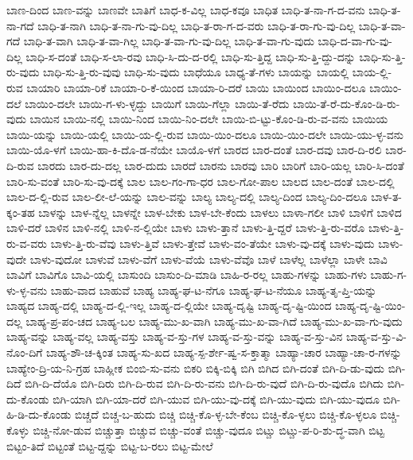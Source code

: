 {ಬಾಣ-ದಿಂದ
ಬಾಣ-ವನ್ನು
ಬಾಣವೇ
ಬಾತಿಗೆ
ಬಾಧ-ಕ-ವಿಲ್ಲ
ಬಾಧ-ಕವೂ
ಬಾಧಿತ
ಬಾಧಿ-ತ-ನಾ-ಗ-ದ-ವನು
ಬಾಧಿ-ತ-ನಾ-ಗದೆ
ಬಾಧಿ-ತ-ನಾಗಿ
ಬಾಧಿ-ತ-ನಾ-ಗು-ವು-ದಿಲ್ಲ
ಬಾಧಿ-ತ-ರಾ-ಗ-ದ-ವರು
ಬಾಧಿ-ತ-ರಾ-ಗು-ವು-ದಿಲ್ಲ
ಬಾಧಿ-ತ-ವಾ-ಗದೆ
ಬಾಧಿ-ತ-ವಾಗಿ
ಬಾಧಿ-ತ-ವಾ-ಗಿಲ್ಲ
ಬಾಧಿ-ತ-ವಾ-ಗು-ವು-ದಿಲ್ಲ
ಬಾಧಿ-ತ-ವಾ-ಗು-ವುದು
ಬಾಧಿ-ದ-ವಾ-ಗು-ವು-ದಿಲ್ಲ
ಬಾಧಿ-ಸ-ದಂತೆ
ಬಾಧಿ-ಸ-ಲಾ-ರವು
ಬಾಧಿ-ಸಿ-ದು-ದ-ರಲ್ಲಿ
ಬಾಧಿ-ಸು-ತ್ತಿದ್ದ
ಬಾಧಿ-ಸು-ತ್ತಿ-ದ್ದು-ದನ್ನು
ಬಾಧಿ-ಸು-ತ್ತಿ-ರು-ವುದು
ಬಾಧಿ-ಸು-ತ್ತಿ-ರು-ವುವು
ಬಾಧಿ-ಸು-ವುದು
ಬಾಧೆಯೂ
ಬಾಧ್ಯ-ತೆ-ಗಳು
ಬಾಯನ್ನು
ಬಾಯಲ್ಲಿ
ಬಾಯ-ಲ್ಲಿ-ರುವ
ಬಾಯಾರಿ
ಬಾಯಾ-ರಿಕೆ
ಬಾಯಾ-ರಿ-ಕೆ-ಯಿಂದ
ಬಾಯಾ-ರಿ-ದರೆ
ಬಾಯಿ
ಬಾಯಿಂದ
ಬಾಯಿಂ-ದಲೂ
ಬಾಯಿಂ-ದಲೆ
ಬಾಯಿಂ-ದಲೇ
ಬಾಯಿ-ಗ-ಳು-ಳ್ಳದ್ದು
ಬಾಯಿಗೆ
ಬಾಯಿ-ಗೆಲ್ಲಾ
ಬಾಯಿ-ತೆ-ರೆದು
ಬಾಯಿ-ತೆ-ರೆ-ದು-ಕೊಂ-ಡಿ-ರು-ವುದು
ಬಾಯಿನ
ಬಾಯಿ-ನಲ್ಲಿ
ಬಾಯಿ-ನಿಂದ
ಬಾಯಿ-ನಿಂ-ದಲೇ
ಬಾಯಿ-ಬಿ-ಟ್ಟು-ಕೊಂ-ಡಿ-ರು-ವ-ವನು
ಬಾಯಿಯ
ಬಾಯಿ-ಯನ್ನು
ಬಾಯಿ-ಯಲ್ಲಿ
ಬಾಯಿ-ಯ-ಲ್ಲಿ-ರುವ
ಬಾಯಿ-ಯಿಂ-ದಲೂ
ಬಾಯಿ-ಯಿಂ-ದಲೇ
ಬಾಯಿ-ಯು-ಳ್ಳ-ವನು
ಬಾಯಿ-ಯೊ-ಳಗೆ
ಬಾಯಿ-ಹಾ-ಕಿ-ದೊ-ಡ-ನೆಯೇ
ಬಾಯೊ-ಳಗೆ
ಬಾರದ
ಬಾರ-ದಂತೆ
ಬಾರ-ದವು
ಬಾರ-ದಿ-ರಲಿ
ಬಾರ-ದಿ-ರುವ
ಬಾರದು
ಬಾರ-ದು-ದಲ್ಲ
ಬಾರ-ದುದು
ಬಾರದೆ
ಬಾರನು
ಬಾರವು
ಬಾರಿ
ಬಾರಿಗೆ
ಬಾರಿ-ಯಲ್ಲ
ಬಾರಿ-ಸಿ-ದಂತೆ
ಬಾರಿ-ಸು-ವಂತೆ
ಬಾರಿ-ಸು-ವು-ದಕ್ಕೆ
ಬಾಲ
ಬಾಲ-ಗಂ-ಗಾ-ಧರ
ಬಾಲ-ಗೋ-ಪಾಲ
ಬಾಲದ
ಬಾಲ-ದಂತೆ
ಬಾಲ-ದಲ್ಲಿ
ಬಾಲ-ದ-ಲ್ಲಿ-ರುವ
ಬಾಲ-ಲೀ-ಲೆ-ಯನ್ನು
ಬಾಲ-ವನ್ನು
ಬಾಲ್ಯ
ಬಾಲ್ಯ-ದಲ್ಲಿ
ಬಾಲ್ಯ-ದಿಂದ
ಬಾಲ್ಯ-ದಿಂ-ದಲೂ
ಬಾಳ-ತ-ಕ್ಕಂ-ತಹ
ಬಾಳನ್ನು
ಬಾಳ-ನ್ನೆಲ್ಲ
ಬಾಳನ್ನೇ
ಬಾಳ-ಬೇಕು
ಬಾಳ-ಬೇ-ಕೆಂದು
ಬಾಳಲು
ಬಾಳಾ-ಗಲೀ
ಬಾಳಿ
ಬಾಳಿಗೆ
ಬಾಳಿದ
ಬಾಳಿ-ದರೆ
ಬಾಳಿನ
ಬಾಳಿ-ನಲ್ಲಿ
ಬಾಳಿ-ನ-ಲ್ಲಿಯೇ
ಬಾಳು
ಬಾಳು-ತ್ತಾನೆ
ಬಾಳು-ತ್ತಿ-ದ್ದರೆ
ಬಾಳು-ತ್ತಿ-ರು-ವರೊ
ಬಾಳು-ತ್ತಿ-ರು-ವ-ವರು
ಬಾಳು-ತ್ತಿ-ರು-ವೆವು
ಬಾಳು-ತ್ತಿವೆ
ಬಾಳು-ತ್ತೇವೆ
ಬಾಳು-ವಂ-ತೆಯೇ
ಬಾಳು-ವು-ದಕ್ಕೆ
ಬಾಳು-ವುದು
ಬಾಳು-ವುದೇ
ಬಾಳು-ವುದೋ
ಬಾಳುವೆ
ಬಾಳು-ವೆಗೆ
ಬಾಳು-ವೆಯೆ
ಬಾಳು-ವೆವೊ
ಬಾಳೆ
ಬಾಳೆಲ್ಲ
ಬಾಳೆಲ್ಲಾ
ಬಾಳೇ
ಬಾವಿ
ಬಾವಿಗೆ
ಬಾವಿಗೊ
ಬಾವಿ-ಯಲ್ಲಿ
ಬಾಸುಂದಿ
ಬಾಸುಂ-ದಿ-ಮಾಡಿ
ಬಾಹಿ-ರ-ರಲ್ಲ
ಬಾಹು-ಗಳನ್ನು
ಬಾಹು-ಗಳು
ಬಾಹು-ಗ-ಳು-ಳ್ಳ-ವನು
ಬಾಹು-ವಾದ
ಬಾಹುವೆ
ಬಾಹ್ಯ
ಬಾಹ್ಯ-ಘ-ಟ-ನೆಗೂ
ಬಾಹ್ಯ-ಘ-ಟ-ನೆಯೂ
ಬಾಹ್ಯ-ತೃ-ಪ್ತಿ-ಯನ್ನು
ಬಾಹ್ಯದ
ಬಾಹ್ಯ-ದಲ್ಲಿ
ಬಾಹ್ಯ-ದ-ಲ್ಲಿ-ಇಲ್ಲ
ಬಾಹ್ಯ-ದ-ಲ್ಲಿಯೇ
ಬಾಹ್ಯ-ದೃಷ್ಟಿ
ಬಾಹ್ಯ-ದೃ-ಷ್ಟಿ-ಯಿಂದ
ಬಾಹ್ಯ-ದೃ-ಷ್ಟಿ-ಯಿಂ-ದಲ್ಲ
ಬಾಹ್ಯ-ಪ್ರ-ಪಂ-ಚದ
ಬಾಹ್ಯ-ಬಲ
ಬಾಹ್ಯ-ಮು-ಖ-ವಾಗಿ
ಬಾಹ್ಯ-ಮು-ಖ-ವಾ-ಗಿದೆ
ಬಾಹ್ಯ-ಮು-ಖ-ವಾ-ಗು-ವುದು
ಬಾಹ್ಯ-ವನ್ನು
ಬಾಹ್ಯ-ವಲ್ಲ
ಬಾಹ್ಯ-ವಸ್ತು
ಬಾಹ್ಯ-ವ-ಸ್ತು-ಗಳ
ಬಾಹ್ಯ-ವ-ಸ್ತು-ವನ್ನು
ಬಾಹ್ಯ-ವ-ಸ್ತು-ವಿನ
ಬಾಹ್ಯ-ವ-ಸ್ತು-ವಿ-ನೊಂ-ದಿಗೆ
ಬಾಹ್ಯ-ಶೌ-ಚ-ಕ್ಕಿಂತ
ಬಾಹ್ಯ-ಸು-ಖದ
ಬಾಹ್ಯ-ಸ್ಪ-ರ್ಶೇ-ಷ್ವ-ಸ-ಕ್ತಾತ್ಮಾ
ಬಾಹ್ಯಾ-ಚಾರ
ಬಾಹ್ಯಾ-ಚಾ-ರ-ಗಳನ್ನು
ಬಾಹ್ಯೇಂ-ದ್ರಿ-ಯ-ನಿ-ಗ್ರಹ
ಬಾಹ್ಲೀಕ
ಬಿಂಬಿ-ಸು-ವನು
ಬಿಕರಿ
ಬಿಕ್ಕಿ-ಬಿಕ್ಕಿ
ಬಿಗಿ
ಬಿಗಿದ
ಬಿಗಿ-ದಂತೆ
ಬಿಗಿ-ದಿ-ಡು-ವುದು
ಬಿಗಿ-ದಿದೆ
ಬಿಗಿ-ದಿ-ದೆಯೊ
ಬಿಗಿ-ದಿರು
ಬಿಗಿ-ದಿ-ರುವ
ಬಿಗಿ-ದಿ-ರು-ವನು
ಬಿಗಿ-ದಿ-ರು-ವುದೆ
ಬಿಗಿ-ದಿ-ರು-ವುದೊ
ಬಿಗಿದು
ಬಿಗಿ-ದು-ಕೊಂಡು
ಬಿಗಿ-ಯಾಗಿ
ಬಿಗಿ-ಯಾ-ದರೆ
ಬಿಗಿ-ಯುವ
ಬಿಗಿ-ಯು-ವು-ದಕ್ಕೆ
ಬಿಗಿ-ಯು-ವುದು
ಬಿಗಿ-ಯು-ವುದೂ
ಬಿಗಿ-ಹಿ-ಡಿ-ದು-ಕೊಂಡು
ಬಿಚ್ಚದೆ
ಬಿಚ್ಚ-ಬ-ಹುದು
ಬಿಚ್ಚಿ
ಬಿಚ್ಚಿ-ಕೊ-ಳ್ಳ-ಬೇ-ಕೆಂಬ
ಬಿಚ್ಚಿ-ಕೊ-ಳ್ಳಲು
ಬಿಚ್ಚಿ-ಕೊ-ಳ್ಳಲೂ
ಬಿಚ್ಚಿ-ಕೊಳ್ಳು
ಬಿಚ್ಚಿ-ನೋ-ಡುವ
ಬಿಚ್ಚುತ್ತಾ
ಬಿಚ್ಚುವ
ಬಿಚ್ಚು-ವಂತೆ
ಬಿಚ್ಚು-ವುದೂ
ಬಿಟ್ಚು
ಬಿಟ್ಚು-ಪ-ರಿ-ಶು-ದ್ಧ-ವಾಗಿ
ಬಿಟ್ಟ
ಬಿಟ್ಟಂ-ತಿದೆ
ಬಿಟ್ಟಂತೆ
ಬಿಟ್ಟ-ದ್ದನ್ನು
ಬಿಟ್ಟ-ಬ-ರಲು
ಬಿಟ್ಟ-ಮೇಲೆ
}
